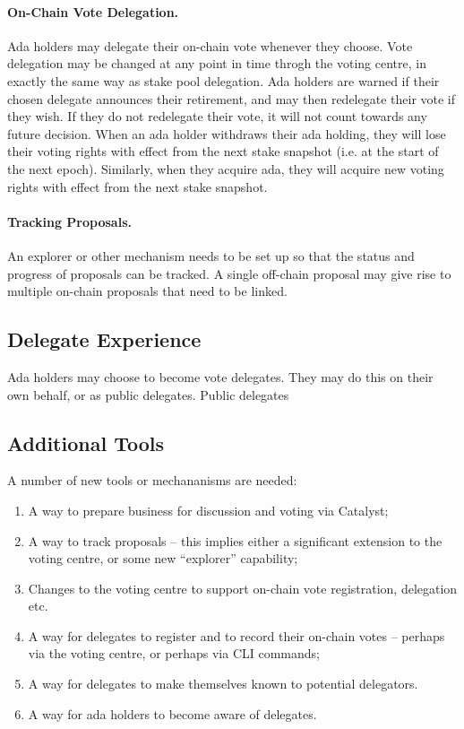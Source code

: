 \paragraph{On-Chain Vote Delegation.}

Ada holders may delegate their on-chain vote whenever they choose.  Vote delegation may be changed at any point in time throgh the voting centre, in
exactly the same way as stake pool delegation.  Ada holders are warned if their chosen delegate announces their retirement, and may then redelegate their vote if they
wish.  If they do not redelegate their vote, it will not count towards any future decision.
When an ada holder withdraws their ada holding, they will lose their voting rights with effect from the next stake snapshot (i.e. at the start of the next
epoch).  Similarly, when they acquire ada, they will acquire new voting rights with effect from the next stake snapshot.

\paragraph{Tracking Proposals.}

An explorer or other mechanism needs to be set up so that the status and progress of proposals can be tracked.  A single off-chain proposal may give rise
to multiple on-chain proposals that need to be linked.

\subsection{Delegate Experience}

Ada holders may choose to become vote delegates.  They may do this on their own behalf, or as public delegates.  Public delegates


\subsection{Additional Tools}

A number of new tools or mechananisms are needed:

\begin{enumerate}
\item
  A way to prepare business for discussion and voting via Catalyst;
\item
  A way to track proposals -- this implies either a significant extension to the voting centre, or some new ``explorer'' capability;
\item
  Changes to the voting centre to support on-chain vote registration, delegation etc.
\item
  A way for delegates to register and to record their on-chain votes -- perhaps via the voting centre, or perhaps via CLI commands;
\item
  A way for delegates to make themselves known to potential delegators.
\item
  A way for ada holders to become aware of delegates.
\end{enumerate}

